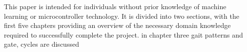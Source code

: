 This paper is intended for individuals without prior knowledge of machine learning or microcontroller technology. It is divided into two sections, with the first five chapters providing an overview of the necessary domain knowledge required to successfully complete the project.
in chapter three gait patterns and gate, cycles are discussed 
\bigskip
%
%
%
%
%

